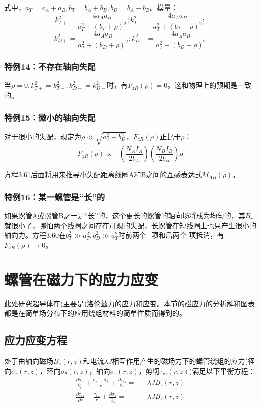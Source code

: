式中，$a_T=a_A+a_B, b_T=b_A+b_B, b_D=b_A−b_B$。模量：
$$
k_{T+}^2=\frac{4a_Aa_B}{a_T^2+(b_T+\rho)^2}; k_{T-}^2=\frac{4a_Aa_B}{a_T^2+(b_T-\rho)^2};$$
$$k_{D+}^2=\frac{4a_Aa_B}{a_T^2+(b_D+\rho)^2};  k_{D-}^2=\frac{4a_Aa_B}{a_T^2+(b_D-\rho)^2}$$


\subsubsection{特例14：不存在轴向失配}
当$\rho=0, k_{T+}^2=k_{T-}^2, k_{D+}^2=k_{D-}^2$时，有$F_{zR}(\rho)=0$。这和物理上的预期是一致的。

\subsubsection{特例15：微小的轴向失配}
对于很小的失配，规定为$\rho\ll \sqrt{a_T^2+b_D^2}$，$F_{zR}(\rho)$正比于$\rho$：
\begin{equation}
F_{zR}(\rho)\propto-(\frac{N_AI_A}{2b_A})(\frac{N_BI_B}{2b_B})\rho
\end{equation}

方程3.61后面将用来推导小失配距离线圈A和B之间的互感表达式$M_{AB}(\rho)$。

\subsubsection{特例16：某一螺管是“长”的}
如果螺管A或螺管B之一是“长”的，这个更长的螺管的轴向场将成为均匀的，其$B_r$就很小了，哪怕两个线圈之间存在可观的失配，长螺管在短线圈上也只产生很小的轴向力。方程3.60在$b^2_T\gg a_T^2,b_D^2\gg a_T^2$时前两个+项和后两个-项抵消，有$F_{zR}(\rho)\rightarrow 0$。

\section{螺管在磁力下的应力应变}
此处研究超导体在(主要是)洛伦兹力的应力和应变。本节的磁应力的分析解和图表都是在简单场分布下的应用绕组材料的简单性质而得到的。

\subsection{应力应变方程}
处于由轴向磁场$B_z(r,z)$和电流$\lambda J$相互作用产生的磁场力下的螺管绕组的应力(径向$\sigma_r(r,z)$，环向$\sigma_\theta(r,z)$，轴向$\sigma_z(r,z)$，剪切$\tau_{rz}(r,z)$)满足以下平衡方程：
\begin{subequations}
	\begin{align}
\frac{\partial\sigma_{r}}{\partial_r}+\frac{\sigma_{r}-\sigma_{\theta}}{r}+\frac{\partial \tau_{rz}}{\partial z}=&-\lambda JB_z(r,z)\\
\frac{\partial \tau_{rz}}{\partial r}-\frac{\tau_{rz}}{r}+\frac{\partial \sigma_z}{\partial_z}=&-\lambda JB_r(r,z)
	\end{align}
\end{subequations}

